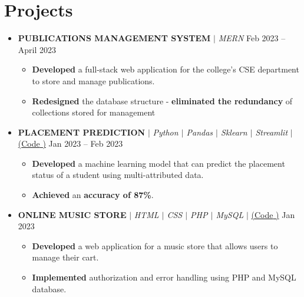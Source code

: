 \documentclass[letterpaper,5pt]{article}
\begin{document}
    \section{Projects}
    \begin{itemize}[leftmargin=0.15in,label={}]
      \item{
        \textbf{PUBLICATIONS MANAGEMENT SYSTEM 
        }$|$ \emph{MERN} 
        }    \hfill   Feb 2023 -- April 2023
        \begin{itemize}
          \item[\textbullet{}]\textbf{Developed} a full-stack web application for the college’s CSE department to store and manage publications.
          \item[\textbullet{}]\textbf{Redesigned} the database structure - \textbf{eliminated the redundancy} of collections stored for management
        \end{itemize}
      \item{
        \textbf{PLACEMENT PREDICTION 
        }$|$ \emph{Python $|$ Pandas $|$ Sklearn $|$ Streamlit}  
        $|$ \href{https://github.com/GSK-10/Placement_Prediction}{({Code} \faExternalLink)}
        } \hfill Jan 2023 -- Feb 2023
        \begin{itemize}
          \item[\textbullet{}]\textbf{Developed} a machine learning model that can predict the placement status of a student using multi-attributed data.
          \item[\textbullet{}] \textbf{Achieved} an \textbf{accuracy of 87\%}.
        \end{itemize}
      \item{
        \textbf{ONLINE MUSIC STORE 
        }$|$ \emph{HTML $|$ CSS $|$ PHP $|$ MySQL} $|$ \href{https://github.com/GSK-10/Online_Music_Store}{({Code} \faExternalLink)}
        } \hfill Jan 2023
        \begin{itemize}
          \item[\textbullet{}] \textbf{Developed} a web application for a music store that allows users to manage their cart.
          \item[\textbullet{}] \textbf{Implemented} authorization and error handling using PHP and MySQL database.
        \end{itemize}
    \end{itemize}
    \vspace*{-6mm}  

    
\end{document}
